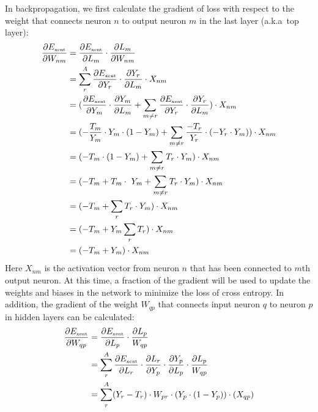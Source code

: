 In backpropagation, we first calculate the
gradient of loss with respect to the 
weight that connects neuron \(n\) to 
output neuron \(m\) in the last layer (a.k.a\ top layer):
\begin{align}
    \frac{\partial E_{\mbox{\tiny xent}}}{\partial W_{nm}} &= \frac{\partial E_{\mbox{\tiny xent}}}{\partial L_m} \cdot \frac{\partial L_m}{\partial W_{nm}}\\
    &= \sum_{r}^{A} \frac{\partial E_{\mbox{\tiny xent}}}{\partial Y_r} \cdot \frac{\partial Y_r}{\partial L_m} \cdot X_{nm}\\
    &= (\frac{\partial E_{\mbox{\tiny xent}}}
            {\partial Y_m} 
        \cdot 
        \frac{\partial Y_m}
        {\partial L_m} 
        + 
        \sum_{m\neq r}
        \frac{\partial E_{\mbox{\tiny xent}}}
        {\partial Y_r} 
        \cdot 
        \frac{\partial Y_r}{\partial L_m} )\cdot X_{nm}\\
    &= (- \frac{T_m}{Y_m} \cdot Y_m \cdot (1-Y_m) + \sum_{m\neq r}\frac{-T_r}{Y_r}\cdot(-Y_r\cdot Y_m)) \cdot X_{nm}\\
    &= (-T_m\cdot(1-Y_m) + \sum_{m\neq r} T_r\cdot Y_m) \cdot X_{nm}\\
    &= (-T_m + T_m\cdot\ Y_m + \sum_{m\neq r} T_r\cdot Y_m) \cdot X_{nm}\\
    &= (-T_m + \sum_r T_r\cdot Y_m) \cdot X_{nm}\\
    &= (-T_m + Y_m \sum_r T_r) \cdot X_{nm}\\
    &= (-T_m + Y_m) \cdot X_{nm}
\end{align}
Here \(X_{nm}\) is the activation vector from neuron \(n\) that has been connected to \(m\)th output neuron.
At this time, a fraction of the gradient will be used 
to update the weights and biases
in the network to minimize the loss of cross entropy.
In addition,
the gradient of the weight \(W_{qp}\) that connects
input neuron \(q\) to neuron \(p\) in hidden layers
can be calculated:
\begin{align}
    \frac{\partial E_{\mbox{\tiny xent}}}{\partial W_{qp}}
    &= \frac{\partial E_{\mbox{\tiny xent}}}{\partial L_p} \cdot \frac{\partial L_p}{W_{qp}} \\
    &= \sum_{r}^{A}\frac{\partial E_{\mbox{\tiny xent}}}{\partial L_r} \cdot \frac{\partial L_r}{\partial Y_p} \cdot \frac{\partial Y_p}{\partial L_p} \cdot \frac{\partial L_p}{W_{qp}} \\
    &= \sum_{r}^{A} (Y_r - T_r)\cdot W_{pr} \cdot (Y_p\cdot(1-Y_p))\cdot(X_{qp})
\end{align}
